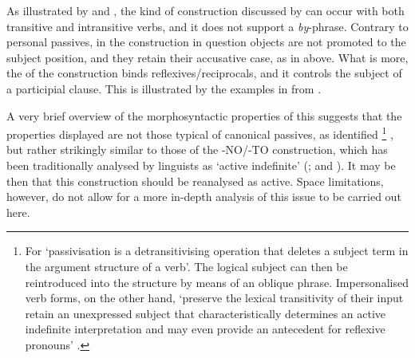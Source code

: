 \documentclass[output=paper]{LSP/langsci}
\begin{document}
\z

As illustrated by  and , the kind of  construction discussed by \citet{FassiFehri2009} can occur with both transitive and intransitive verbs, and it does not support a \textit{by}{}-phrase. Contrary to personal passives, in the  construction in question objects are not promoted to the subject position, and they retain their accusative case, as in  above. What is more, the  of the  construction binds reflexives/reciprocals, and it controls the subject of a participial clause. This is illustrated by the examples in  from   \citet[17]{FassiFehri2009}.

\z


A very brief overview of the morphosyntactic properties of this   suggests that the properties displayed are not those typical of canonical passives, as identified \citet{Blevins2003}\footnote{For \citet[512]{Blevins2003} ‘passivisation is a detransitivising operation that deletes a subject term in the argument structure of a verb’. The logical subject can then be reintroduced into the structure by means of an oblique phrase. Impersonalised verb forms, on the other hand, ‘preserve the lexical transitivity of their input retain an unexpressed subject that characteristically determines an active indefinite interpretation and may even provide an antecedent for reflexive pronouns’ \citep[508]{Blevins2003}.} , but rather strikingly similar to those of the  -NO/-TO construction, which has been traditionally analysed by  linguists as ‘active indefinite’ (\citealt{Wierzbicka1966,Doros1975,Brajerski1979,Bogusławski1984,Siewierska1988}; and \citealt{Rozwadowska1992}). It may be then that this  construction should be reanalysed as active. Space limitations, however, do not allow for a more in-depth analysis of this issue to be carried out here.
\end{document}
